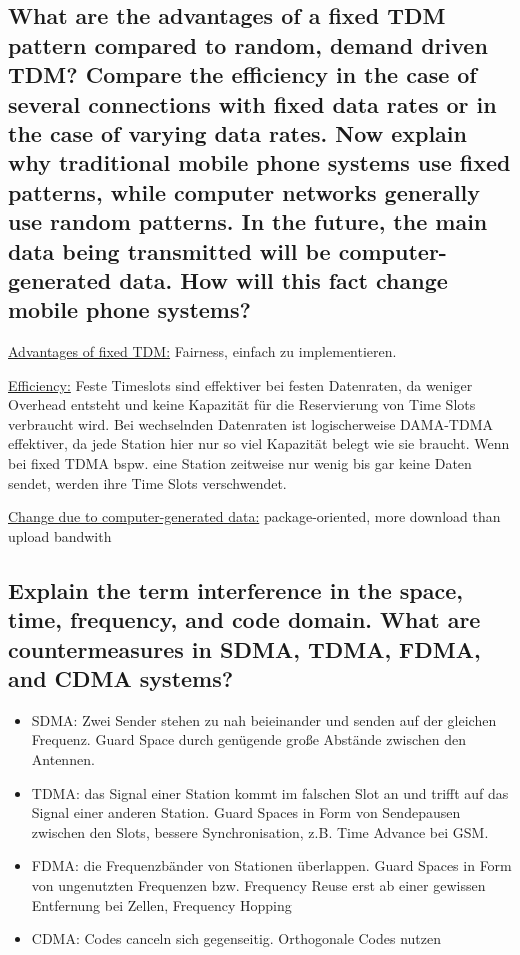 \subsection{What are the advantages of a fixed TDM pattern compared to random, demand
driven TDM? Compare the efficiency in the case of several connections with fixed
data rates or in the case of varying data rates. Now explain why traditional mobile
phone systems use fixed patterns, while computer networks generally use random
patterns. In the future, the main data being transmitted will be computer-generated
data. How will this fact change mobile phone systems?}
\underline{Advantages of fixed TDM:} Fairness, einfach zu implementieren.

\underline{Efficiency:} Feste Timeslots sind effektiver bei festen Datenraten, da weniger Overhead entsteht und keine Kapazität für die Reservierung von Time Slots verbraucht wird. Bei wechselnden Datenraten ist logischerweise DAMA-TDMA effektiver, da jede Station hier nur so viel Kapazität belegt wie sie braucht. Wenn bei fixed TDMA bspw. eine Station zeitweise nur wenig bis gar keine Daten sendet, werden ihre
Time Slots verschwendet.

\underline{Change due to computer-generated data:}  package-oriented, more download than upload bandwith

\subsection{Explain the term interference in the space, time, frequency, and code domain. What
are countermeasures in SDMA, TDMA, FDMA, and CDMA systems?}
\begin{itemize}

\item SDMA: Zwei Sender stehen zu nah beieinander und senden auf der gleichen Frequenz. Guard Space durch genügende große Abstände zwischen den Antennen.

\item TDMA: das Signal einer Station kommt im falschen Slot an und trifft auf das Signal einer anderen Station. Guard Spaces in Form von Sendepausen zwischen den Slots, bessere Synchronisation, z.B. Time Advance bei GSM.

\item FDMA: die Frequenzbänder von Stationen überlappen. Guard Spaces in Form von ungenutzten Frequenzen bzw. Frequency Reuse erst ab einer gewissen Entfernung bei Zellen, Frequency Hopping

\item CDMA: Codes canceln sich gegenseitig. Orthogonale Codes nutzen

\end{itemize}

